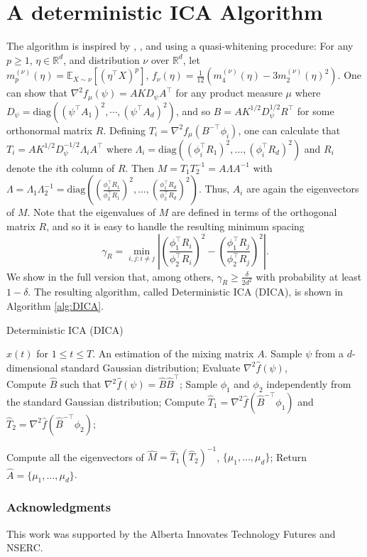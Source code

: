 \documentclass{article} %
\newcommand{\real}{\mathbb{R}}
\newcommand{\E}{\mathbb{E}}
\theoremstyle{definition}
\begin{document}
\section{A deterministic ICA Algorithm}
\label{sec:DICA}
The algorithm is inspired by \citet{hsu2013learning}, \citet{arora2012provable}, and \citet{frieze1996learning} using a quasi-whitening procedure:
For any $p\ge 1$, $\eta\in \real^d$, and distribution $\nu$ over $\real^d$,
let 
$m_p^{(\nu)}(\eta) = \E_{X\sim \nu}[ (\eta^\top X)^p ],\, f_{\nu}(\eta) = \tfrac1{12} \left( m_4^{(\nu)}(\eta) - 3 m_2^{(\nu)}(\eta)^2 \right)$.
One can show that $\nabla^2 f_\mu(\psi)=A K D_{\psi} A^\top$ for any product measure $\mu$ where $D_{\psi} =\text{diag}\left((\psi^{\top}A_1)^2,\cdots, (\psi^{\top}A_d)^2\right)$,
and so $B= AK^{1/2}D_{\psi}^{1/2}R^{\top}$ for some orthonormal matrix $R$. Defining $T_i=\nabla^2 f_\mu(B^{-\top} \phi_i)$, one can calculate that
$T_i=A K^{1/2} D_\psi^{-1/2} \Lambda_i A^\top$ where $\Lambda_i =\text{diag}\left( (\phi_i^\top R_1)^2,\ldots,(\phi_i^\top R_d)^2 \right)$ and $R_i$ denote the $i$th column of $R$.
Then $M=T_1 T_2^{-1} = A\Lambda A^{-1}$ with $\Lambda=\Lambda_1 \Lambda_2^{-1}=\text{diag}\left( \left(\frac{\phi_1^\top R_1}{\phi_2^\top R_1}\right)^2,\ldots,\left(\frac{\phi_1^\top R_d}{\phi_2^\top R_d}\right)^2 \right)$. Thus, $A_i$ are again the eigenvectors of $M$.
Note that the eigenvalues of $M$ are defined in terms of the orthogonal matrix $R$,
and so it is easy to handle the resulting minimum spacing
\begin{equation}
\label{def:gammaR}
\gamma_R =  \min_{i,j: i\neq j} \left\vert \left(\frac{\phi_1^{\top}R_i}{\phi_2^{\top}R_i}\right)^2 - \left(\frac{\phi_1^{\top}R_j}{\phi_2^{\top}R_j}\right)^2 \right\vert.
\end{equation}
We show in the full version \citep{HuGySz15} %
that, among others,  $\gamma_R \ge\frac{\delta}{2d^2}$ with probability at least $1-\delta$.
The resulting algorithm, called Deterministic ICA (DICA), is shown in Algorithm \ref{alg:DICA}. 
\begin{algorithm}
\caption{Deterministic ICA (DICA)}
\label{alg:DICA}
\begin{algorithmic}[1]
\INPUT $x(t)$ for $1\le t \le T$. 
\OUTPUT An estimation of the mixing matrix $A$. 
\STATE Sample $\psi$ from a $d$-dimensional standard Gaussian distribution;
\STATE Evaluate $\nabla^2\hat{f}(\psi)$, \\
\STATE Compute $\hat{B}$ such that $\nabla^2\hat{f}(\psi) = \hat{B}\hat{B}^{\top}$;
\STATE Sample $\phi_1$ and $\phi_2$ independently from the standard Gaussian distribution;
\STATE Compute $\hat{T}_1 =\nabla^2\hat{f}(\hat{B}^{-\top}\phi_1)$ and  $\hat{T}_2 =\nabla^2\hat{f}(\hat{B}^{-\top}\phi_2)$;

\STATE Compute all the eigenvectors of $\hat{M} = \hat{T}_1\left(\hat{T}_2\right)^{-1}$, $\{\mu_1,\ldots,\mu_d\}$;
\STATE Return $\hat{A} = \{\mu_1,\ldots,\mu_d\}$.
\end{algorithmic}
\end{algorithm}

\subsubsection*{Acknowledgments}
This work was supported by the Alberta Innovates Technology Futures and NSERC.


\end{document}
